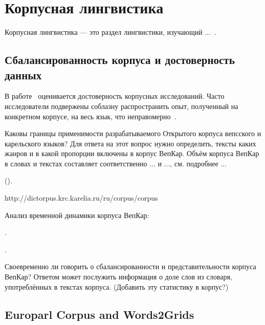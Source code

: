 \section{Корпусная лингвистика} \label{sect_review_corpus_linguistics}

Корпусная лингвистика --- это раздел лингвистики, изучающий ...~\cite{Zakharov2005}.



\subsection{Сбалансированность корпуса и достоверность данных}

В работе~\cite{Belikov2013}
оценивается достоверность корпусных исследований. 
Часто исследователи подвержены соблазну распространить опыт, полученный на конкретном корпусе, 
на весь язык, что неправомерно~\cite{Belikov2013}.

Каковы границы применимости разрабатываемого Открытого корпуса вепсского и карельского языков? 
Для ответа на этот вопрос нужно определить, тексты каких жанров и в какой пропорции включены в корпус ВепКар. 
Объём корпуса ВепКар в словах и текстах составляет соответственно ... и ..., см. подробнее ... 

().


http://dictorpus.krc.karelia.ru/ru/corpus/corpus

\bigskip

Анализ временной динамики корпуса ВепКар: 

.

.

\bigskip

Своевременно ли говорить о сбалансированности и представительности корпуса ВепКар? 
Ответом может послужить информация о доле слов из словаря, употреблённых в текстах корпуса. 
(Добавить эту статистику в корпус?)



\subsection{Europarl Corpus and Words2Grids}


